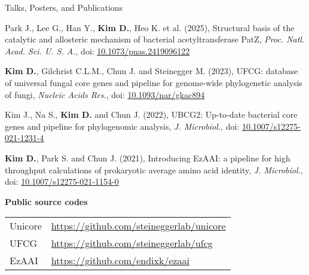 \documentclass{resume} %
\renewcommand{\url}[1]{\uline{\href{#1}{#1}}}
\newcommand{\uhref}[2]{\href{#1}{\uline{#2}}}
\newcommand{\doi}[1]{\uhref{https://doi.org/#1}{#1}}
\newcommand{\subheading}[1]{%
  \vspace{0.5mm}%
  {\fontsize{11.5pt}{13pt}\selectfont\bfseries #1}%
  \vspace{1mm}%
}
\begin{document}
\begin{rSection}{Talks, Posters, and Publications}
\begin{thebibliography}{10}
Park J., Lee G., Han Y., {\bf Kim D.}, Heo K. et al. (2025),
Structural basis of the catalytic and allosteric mechanism of bacterial acetyltransferase PatZ, {\em Proc. Natl. Acad. Sci. U. S. A.}, doi: \doi{10.1073/pnas.2419096122}

{\bf Kim D.}, Gilchrist C.L.M., Chun J. and Steinegger M. (2023),
UFCG: database of universal fungal core genes and pipeline for genome-wide phylogenetic analysis of fungi, {\em Nucleic Acids Res.}, doi: \doi{10.1093/nar/gkac894}

Kim J., Na S., {\bf Kim D.} and Chun J.  (2022), 
UBCG2: Up-to-date bacterial core genes and pipeline for phylogenomic analysis, {\em J. Microbiol.}, doi: \doi{10.1007/s12275-021-1231-4}

{\bf Kim D.}, Park S. and Chun J. (2021),
Introducing EzAAI: a pipeline for high throughput calculations of prokaryotic average amino acid identity, {\em J. Microbiol.}, doi: \doi{10.1007/s12275-021-1154-0}

\end{thebibliography}
\vspace{4mm}

\begin{comment}
\subheading{Preprints}\\[-26mm]

\begin{thebibliography}{10}

\vspace{8mm}

\end{thebibliography}
\vspace{4mm}
\end{comment}

\subheading{Public source codes}

\begin{tabular}{p{2.5cm}p{14.1cm}}
Unicore &  \url{https://github.com/steineggerlab/unicore} \\[1.mm]
UFCG  & \url{https://github.com/steineggerlab/ufcg} \\[1.mm]
EzAAI  & \url{https://github.com/endixk/ezaai} \\[1.mm]
\end{tabular}
\vspace{2mm}

\end{rSection}
\newpage
\end{document}

